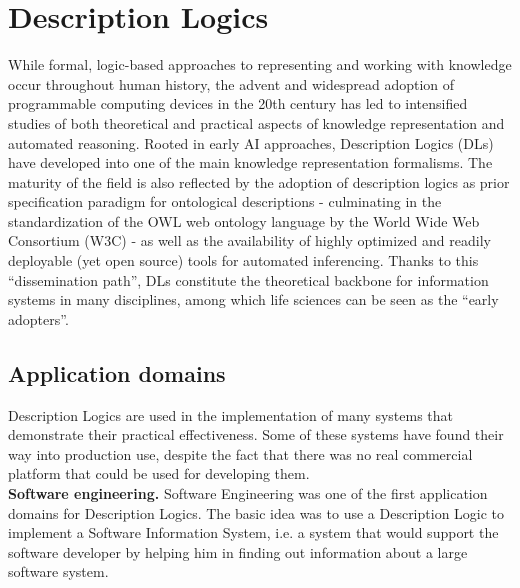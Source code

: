 \documentclass[a4paper, 11pt, oneside]{elsarticle}
\begin{document}
\newpage



\section{Description Logics}

While formal, logic-based approaches to representing and working with knowledge occur throughout human history, the advent and widespread adoption of programmable computing devices in the 20th century has led to intensified studies of both theoretical and practical aspects of knowledge representation and automated reasoning.
Rooted in early AI approaches, Description Logics (DLs) have developed into one of the main knowledge representation formalisms.
The maturity of the field is also reflected by the adoption of description logics as prior specification paradigm for ontological descriptions - culminating in the standardization of the OWL web ontology language by the World Wide Web Consortium (W3C) - as well as the availability of highly optimized and readily deployable (yet open source) tools for automated inferencing.
Thanks to this ``dissemination path'', DLs constitute the theoretical backbone for information systems in many disciplines, among which life sciences can be seen as the ``early adopters''\cite{Sidhu05proteinontology, Golbreich:2006:FMA:1222219.1222304, Wolstencroft:2005:LSW:2079844.2079902}.

\subsection{Application domains}
Description Logics are used in the implementation of many systems that demonstrate their practical effectiveness. Some of these systems have found their way into production use, despite the fact that there was no real commercial platform that could be used for developing them.\\

\textbf{Software engineering.} Software Engineering was one of the first application domains for Description Logics. The basic idea was to use a Description Logic to implement a Software Information System, i.e. a system that would support the software developer by helping him in finding out information about a large software system.\\
\end{document}
